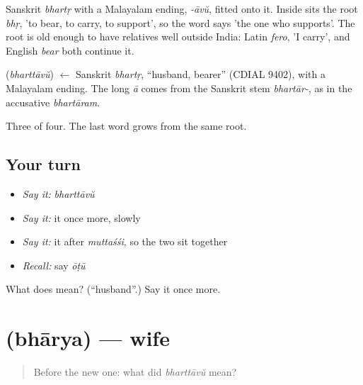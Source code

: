 Sanskrit \emph{bhartṛ} with a Malayalam ending, \emph{-āvŭ}, fitted onto it. Inside sits the root \emph{bhṛ}, 'to bear, to carry, to support', so the word says 'the one who supports'. The root is old enough to have relatives well outside India: Latin \emph{fero}, 'I carry', and English \emph{bear} both continue it.

\begin{cousinweb}
\textbf{} (\emph{bharttāvŭ}) $\leftarrow$ Sanskrit \emph{bhartṛ}, \textquotedblleft{}husband, bearer\textquotedblright{} (CDIAL 9402), with a Malayalam ending. The long \emph{ā} comes from the Sanskrit stem \emph{bhartār-}, as in the accusative \emph{bhartāram}.
\end{cousinweb}

\begin{grammarlens}[title={What you've built}]
Three of four. The last word grows from the same root.
\end{grammarlens}

\subsection*{Your turn}
\begin{itemize}
\raggedright
  \item \emph{Say it:} \emph{bharttāvŭ}
  \item \emph{Say it:} it once more, slowly
  \item \emph{Say it:} it after \emph{muttaśśi}, so the two sit together
  \item \emph{Recall:} say \emph{ōṭū}
\end{itemize}

\begin{tcolorbox}[breakable,colback=teal!4,colframe=teal!35!black,title={Before you move on}]
What does  mean? (\textquotedblleft{}husband\textquotedblright{}.) Say it once more.
\end{tcolorbox}
\section[\texorpdfstring{\ml{ഭാര്യ} (bhārya)}{ഭാര്യ (bhārya)}]{ (bhārya) — wife}

\label{lesson:ML-C45-wife}



\begin{quote}
Before the new one: what did \emph{bharttāvŭ} mean?
\end{quote}

